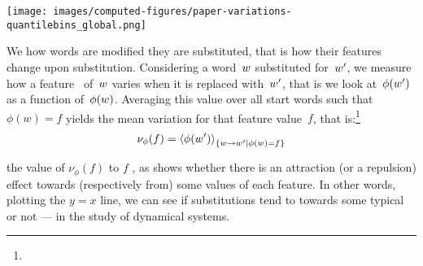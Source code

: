 \begin{figure*}[!th]
    \centering
    \texttt{[image: images/computed-figures/paper-variations-quantilebins\_global.png]}
    \caption{\textbf{Feature variation upon substitution:}
    $\nu_\phi$, average feature value of the appearing word as a function of the feature value of the disappearing word in a substitution , with 95\% asymptotic confidence intervals based on Student's \emph{t}-distribution.
    The overall position of the curve with respect to the dashed line representing $\mathcal{H}_0$ (constant $\nu_{\phi}^0$) indicates the direction of the cognitive bias .
    The intersection with $y = x$ marks the attractor value.
    The fact that all curves have slopes smaller than 1  means that the substitution operation is contractile on average:
     each feature  its own specific asymptotic range.
    }
    \label{fig:feature-variations-global}
\end{figure*}

We  how words are modified  they are substituted, that is how their features change upon substitution.
Considering a word~$w$ substituted for~$w'$, we measure how a feature~\newtext{$\phi$} of~$w$ varies when it is replaced with~$w'$, that is we look at~$\phi(w')$ as a function of~$\phi(w)$.
Averaging this value over all start words such that $\phi(w) = f$ yields the mean variation for that feature value~$f$, that is:\footnote{
}
$$\nu_{\phi}(f) = \left<\phi(w')\right>_{\left\lbrace w\rightarrow w' | \phi(w) = f \right\rbrace}$$

 the value of $\nu_{\phi}(f)$ to $f$ , as  shows whether there is an attraction (or a repulsion) effect towards (respectively from) some values of each feature.
In other words, plotting the $y=x$ line, we can see if substitutions tend to  towards some typical  or not ---  in the study of dynamical systems.

